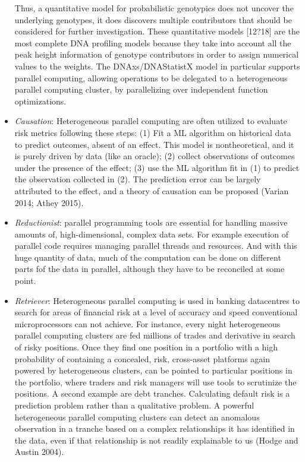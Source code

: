 \documentclass[10pt]{article}[draft]
\begin{document}
\begin{itemize}
Thus, a quantitative model for probabilistic genotypics does not uncover the underlying genotypes, it does discovers multiple contributors that should be considered for further investigation.
 These {quantitative} models [12?18] are the most complete DNA profiling models because they take into account all  the peak height information of genotype contributors in order to assign numerical values to the weights. The DNAxs/DNAStatistX model in particular supports parallel computing, allowing operations to be delegated to a heterogeneous parallel computing cluster, by parallelizing over independent function optimizations. 
	\item \emph{Causation}: Heterogeneous parallel computing are often utilized to evaluate risk metrics following these steps: (1) Fit a ML algorithm on historical data to predict outcomes, absent of an effect. This model is nontheoretical, and it is purely driven by data (like an oracle); (2) collect observations of outcomes under the presence of the effect; (3) use the ML algorithm fit in (1) to predict the observation collected in (2). The prediction error can be largely attributed to the effect, and a theory of causation can be proposed (Varian 2014; Athey 2015).
	\item \emph{Reductionist}: parallel programming tools  are essential for handling  massive amounts of, high-dimensional, complex data sets. For example execution of parallel code requires managing parallel threads and resources.  And with this huge quantity of data, much of the computation can be done on different parts fof the data in parallel, although they have to be reconciled at some point. 
	\item \emph{Retriever}: Heterogeneous parallel computing  is used in banking datacentres to search for areas of financial risk at a level of accuracy and speed conventional microprocessors can not achieve. For instance, every night heterogeneous parallel computing clusters are fed millions of trades and derivative  in search of risky positions. Once they find one position in a portfolio with a high probability of containing a concealed, risk, cross-asset platforms  again powered by heterogeneous clusters, can be pointed to particular positions in the portfolio, where traders  and risk managers will use tools to scrutinize the positions. A second example are debt tranches. Calculating default risk is a prediction problem rather than a qualitative problem. A powerful heterogeneous parallel computing clusters can detect an anomalous observation in a tranche based on a complex relationships it has identified in the data, even if that relationship is not readily explainable to us (Hodge and Austin 2004).

\end{itemize}
\end{document}
